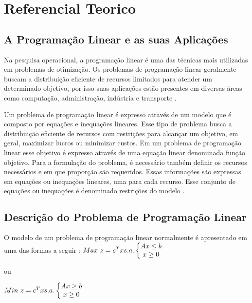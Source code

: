 \chapter{Referencial Teorico}

\section{A Programação Linear e as suas Aplicações}
Na pesquisa operacional, a programação linear é uma das técnicas mais utilizadas em problemas de otimização. Os problemas de programação linear geralmente buscam a distribuição eficiente de recursos limitados para atender um determinado objetivo, por isso suas aplicações estão presentes em diversas áreas como computação, administração, indústria e transporte \cite{Engecom}.

Um problema de programação linear é expresso através de um modelo que é composto por equações e inequações lineares. Esse tipo de problema busca a distribuição eficiente de recursos com restrições para alcançar um objetivo, em geral, maximizar lucros ou minimizar custos. Em um problema de programação linear esse objetivo é expresso através de uma equação linear denominada função objetivo. Para a formulação do problema, é necessário também definir os recursos necessários e em que proporção são requeridos. Essas informações são expressas em equações ou inequações lineares, uma para cada recurso. Esse conjunto de equações ou inequações é denominado restrições do modelo \cite{Engecom}.

\section{Descrição do Problema de Programação Linear}
O modelo de um problema de programação linear normalmente é apresentado em uma das formas a seguir \cite{Passos}:
$\\Max\ z = c^{T}x \\\\s.a.\left\{\begin{matrix}
Ax\leq b\\x\geq 0 
\end{matrix}\right.$  

ou  

$\\Min\ z = c^{T}x \\\\s.a.\left\{\begin{matrix}
Ax\geq  b\\x\geq 0 
\end{matrix}\right.$


